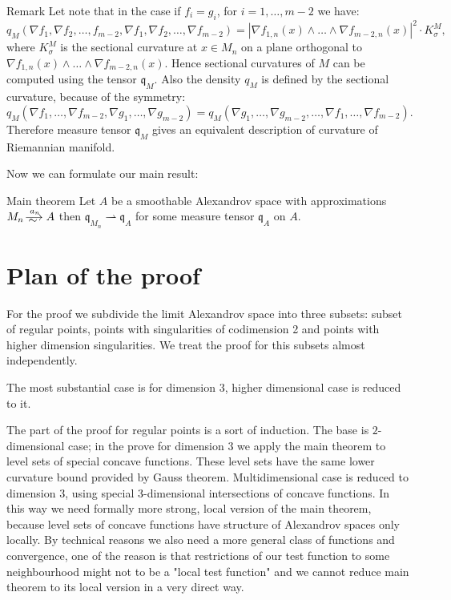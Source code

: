\documentclass[a4paper,10pt]{article}
\begin{document}
\begin{rdef}{Remark}\label{K=q}
Let note that in the case if $f_i=g_i$, for $i=1,\dots,m-2$
we have:
$$q_M(\nabla f_1,\nabla f_2,\dots,f_{m-2},\nabla f_1,\nabla f_2,\dots,\nabla f_{m-2})=|\nabla f_{1,n}(x)\wedge\dots \wedge\nabla f_{m-2,n}(x)|^2\cdot K^M_\sigma, $$
where $K^M_\sigma $ is the sectional curvature at $x\in M_n$
on a plane orthogonal to 
$\nabla f_{1,n}(x)\wedge\dots \wedge\nabla f_{m-2,n}(x)$.
Hence
sectional curvatures of $M$ can  be computed using the tensor
$\mathfrak{q}_M$.
Also the density $q_M$ is defined by the sectional curvature,
because of the symmetry:
$${q}_M(\nabla f_1,\dots,\nabla f_{m-2},\nabla g_1,\dots,\nabla g_{m-2})=
{q}_M(\nabla g_1,\dots,\nabla g_{m-2},\dots,\nabla f_1,\dots,\nabla f_{m-2}).$$
Therefore measure tensor $\mathfrak{q}_M$
gives an equivalent description of curvature of Riemannian manifold.
\end{rdef}
Now we can formulate our main result:
  
\begin{thm}{Main theorem}\label{main}
Let  $A$  be a smoothable Alexandrov space with approximations
$M_n\smooths{a_n} A$ then $\mathfrak{q}_{M_n}\rightharpoonup \mathfrak{q}_A$ 
for some measure tensor $\mathfrak{q}_A$ on $A$.
\end{thm}


\section{Plan of the proof}
For the proof we subdivide the limit Alexandrov space into
three subsets: subset of regular 
points, points with singularities of codimension 2 and points with higher dimension 
singularities. We treat the proof for this subsets almost independently.

The most substantial case is for dimension $3$, higher dimensional case is reduced to it.

The part of the proof for regular points is a sort of induction.
The base is $2$-dimensional case; in the prove
 for dimension $3$ we apply the main theorem to
 level sets of special concave functions.
 These level sets have
the same lower curvature bound 
provided by Gauss theorem. 
  Multidimensional case
 is reduced to dimension $3$, using special $3$-dimensional intersections
 of concave functions.
In this way we need formally more strong, local version of 
 the main theorem, because level sets of concave functions
have structure of Alexandrov spaces only locally.
By technical reasons
we also need a more general class of functions and convergence,
one of the reason is that restrictions of our test
function to some neighbourhood might not to be a "local test function" and we cannot
reduce main theorem to its local version in a very direct way.
\end{document}
